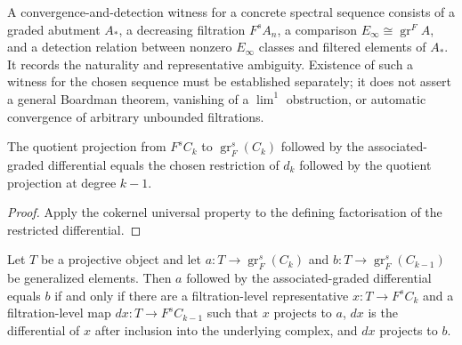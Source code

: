 \begin{definition}
  \label{def:ss-convergence-detection-witness}
  \leanok
  A convergence-and-detection witness for a concrete spectral sequence consists
  of a graded abutment $A_*$, a decreasing filtration $F^sA_n$, a comparison
  $E_\infty\cong\operatorname{gr}^F A$, and a detection relation between
  nonzero $E_\infty$ classes and filtered elements of $A_*$.  It records the
  naturality and representative ambiguity. Existence of such a witness
  for the chosen sequence must be established separately; it does
  not assert a general Boardman theorem, vanishing of a $\lim^1$ obstruction,
  or automatic convergence of arbitrary unbounded filtrations.
\end{definition}

\begin{lemma}
  \label{lem:filtered-associated-graded-differential-projection}
  \leanok
  The quotient projection from $F^sC_k$ to
  $\operatorname{gr}^s_F(C_k)$ followed by the associated-graded differential
  equals the chosen restriction of $d_k$ followed by the quotient projection at
  degree $k-1$.
\end{lemma}

\begin{proof}
  \leanok
  Apply the cokernel universal property to the defining factorisation of the
  restricted differential.
\end{proof}

\begin{theorem}
  \label{thm:filtered-associated-graded-differential-representative}
  \leanok
  Let $T$ be a projective object and let
  $a:T\to\operatorname{gr}^s_F(C_k)$ and
  $b:T\to\operatorname{gr}^s_F(C_{k-1})$ be generalized elements.  Then
  $a$ followed by the associated-graded differential equals $b$ if and only
  if there are a filtration-level representative $x:T\to F^sC_k$ and a
  filtration-level map $dx:T\to F^sC_{k-1}$ such that $x$ projects to $a$,
  $dx$ is the differential of $x$ after inclusion into the underlying
  complex, and $dx$ projects to $b$.
\end{theorem}

